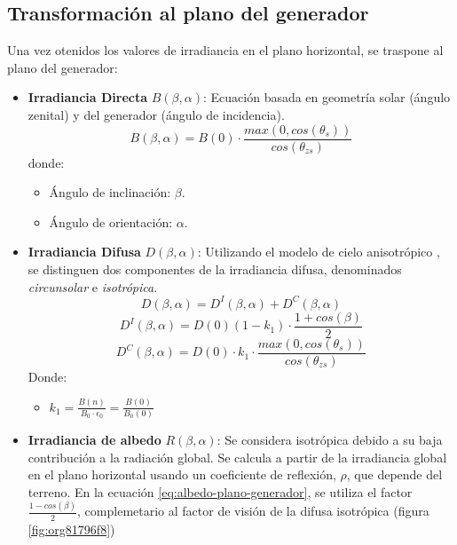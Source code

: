\subsection{Transformación al plano del generador}
\label{sec:orgc1f77ef}
\label{subsec:transformación-plano-generador}
Una vez otenidos los valores de irradiancia en el plano horizontal, se traspone al plano del generador:
\begin{itemize}
\item \textbf{Irradiancia Directa} \(B(\beta ,\alpha)\): Ecuación basada en geometría solar (ángulo zenital) y del generador (ángulo de incidencia).
\begin{equation}
B(\beta ,\alpha)=B(0)\cdot \frac{max(0,cos(\theta_s))}{cos(\theta_{zs})}
\label{eq:irradiancia-directa-plano-generador}
\end{equation}
donde:
\begin{itemize}
\item Ángulo de inclinación: \(\beta\).
\item Ángulo de orientación: \(\alpha\). 
\end{itemize}
\item \textbf{Irradiancia Difusa} \(D(\beta ,\alpha)\): Utilizando el modelo de cielo anisotrópico \cite{Perpinan2023}, se distinguen dos componentes de la irradiancia difusa, denominados \emph{circunsolar} e \emph{isotrópica}.  
\begin{equation}
D(\beta ,\alpha)=D^I(\beta ,\alpha)+D^C(\beta ,\alpha)
\end{equation}
\begin{equation}
D^I(\beta ,\alpha)=D(0)(1-k_1)\cdot \frac{1+cos(\beta)}{2}
\end{equation}
\begin{equation}
D^C(\beta, \alpha)=D(0)\cdot k_1\cdot \frac{max(0,cos(\theta_s))}{cos(\theta_{zs})}
\end{equation}
Donde:
\begin{itemize}
\item \(k_1=\frac{B(n)}{B_0\cdot \epsilon_0}=\frac{B(0)}{B_0(0)}\)
\end{itemize}
\item \textbf{Irradiancia de albedo} \(R(\beta ,\alpha)\): Se considera isotrópica debido a su baja contribución a la radiación global. Se calcula a partir de la irradiancia global en el plano horizontal usando un coeficiente de reflexión, \(\rho\), que depende del terreno. En la ecuación \ref{eq:albedo-plano-generador}, se utiliza el factor \(\frac{1-cos(\beta)}{2}\), complemetario al factor de visión de la difusa isotrópica (figura \ref{fig:org81796f8})

\end{itemize}
